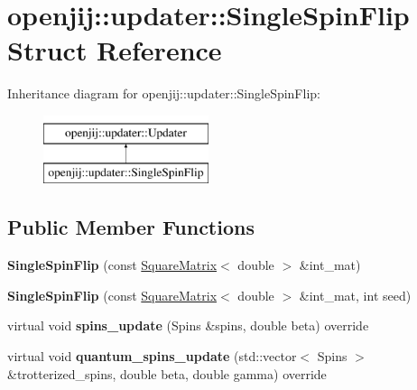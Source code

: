 \hypertarget{structopenjij_1_1updater_1_1_single_spin_flip}{}\section{openjij\+::updater\+::Single\+Spin\+Flip Struct Reference}
\label{structopenjij_1_1updater_1_1_single_spin_flip}
Inheritance diagram for openjij\+::updater\+::Single\+Spin\+Flip\+:\begin{figure}[H]
\begin{center}
\leavevmode
\includegraphics[height=2.000000cm]{structopenjij_1_1updater_1_1_single_spin_flip}
\end{center}
\end{figure}
\subsection*{Public Member Functions}
\begin{DoxyCompactItemize}
\item 
\mbox{\label{structopenjij_1_1updater_1_1_single_spin_flip_a605251e291c2fbc39272ae1b95245b85}} 
{\bfseries Single\+Spin\+Flip} (const \mbox{\hyperlink{structopenjij_1_1_square_matrix}{Square\+Matrix}}$<$ double $>$ \&int\+\_\+mat)
\item 
\mbox{\label{structopenjij_1_1updater_1_1_single_spin_flip_a90832724b251f31d67c65444224febb0}} 
{\bfseries Single\+Spin\+Flip} (const \mbox{\hyperlink{structopenjij_1_1_square_matrix}{Square\+Matrix}}$<$ double $>$ \&int\+\_\+mat, int seed)
\item 
\mbox{\label{structopenjij_1_1updater_1_1_single_spin_flip_a8ad783a9ccbe56d2d8bd79161daaf3f5}} 
virtual void {\bfseries spins\+\_\+update} (Spins \&spins, double beta) override
\item 
\mbox{\label{structopenjij_1_1updater_1_1_single_spin_flip_a1a8f0f57e0621192721c355d60a1b81d}} 
virtual void {\bfseries quantum\+\_\+spins\+\_\+update} (std\+::vector$<$ Spins $>$ \&trotterized\+\_\+spins, double beta, double gamma) override
\end{DoxyCompactItemize}
